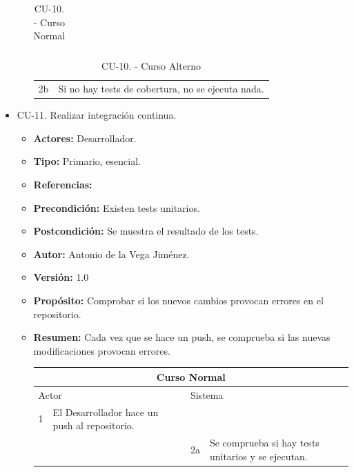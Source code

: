 \begin{itemize}
\begin{itemize}
\begin{table}[H]
\begin{tabularx}{\textwidth}{|l|X|l|X|}
                                  
      \end{tabularx}
      \caption{CU-10. - Curso Normal}
      \label{table-16}
    \end{table}
    \begin{table}[H]
      \centering
      \begin{tabularx}{\textwidth}{|l|X|}
       \hline
       \rowcolor[HTML]{C0C0C0} 
       \multicolumn{2}{|l|}{\cellcolor[HTML]{C0C0C0}Curso Alterno} \\ \hline
       \rowcolor[HTML]{FFFFFF} 
              2b                      & Si no hay tests de cobertura, no se ejecuta nada.                            \\ \hline
      \end{tabularx}
      \caption{CU-10. - Curso Alterno}
      \label{table-17}
    \end{table}
  \end{itemize}
  \item CU-11. Realizar integración continua.
  \begin{itemize}
    \item \textbf{Actores:} Desarrollador.
    \item \textbf{Tipo:} Primario, esencial.
    \item \textbf{Referencias:}
    \item \textbf{Precondición:} Existen tests unitarios.
    \item \textbf{Postcondición:} Se muestra el resultado de los tests.
    \item \textbf{Autor:} Antonio de la Vega Jiménez.
    \item \textbf{Versión:} 1.0
    \item \textbf{Propósito:} Comprobar si los nuevos cambios provocan errores en el repositorio.
    \item \textbf{Resumen:} Cada vez que se hace un \gls{push}, se comprueba si las nuevas modificaciones provocan errores.
    \begin{table}[H]
      \centering
      \begin{tabularx}{\textwidth}{|l|X|l|X|}
        \hline
        \multicolumn{4}{|c|}{\cellcolor[HTML]{C0C0C0}Curso Normal}                                                 \\ \hline
        \multicolumn{2}{|l|}{\cellcolor[HTML]{EFEFEF}Actor} & \multicolumn{2}{l|}{\cellcolor[HTML]{EFEFEF}Sistema} \\ \hline
        1                         & El Desarrollador hace un push al repositorio.                        &                            &                         \\ \hline
                                  &                         & 2a                          & Se comprueba si hay tests unitarios y se ejecutan.                       \\ \hline


\end{tabularx}
\end{table}
\end{itemize}
\end{itemize}
